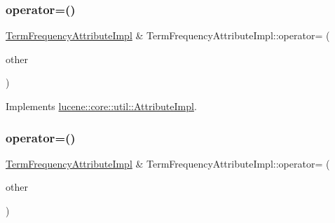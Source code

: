 \subsubsection{\texorpdfstring{operator=()}{operator=()}\hspace{0.1cm}{\footnotesize\ttfamily [1/2]}}
{\footnotesize\ttfamily \mbox{\hyperlink{classlucene_1_1core_1_1analysis_1_1tokenattributes_1_1TermFrequencyAttributeImpl}{Term\+Frequency\+Attribute\+Impl}} \& Term\+Frequency\+Attribute\+Impl\+::operator= (\begin{DoxyParamCaption}\item[{\mbox{\hyperlink{ZlibCrc32_8h_a2c212835823e3c54a8ab6d95c652660e}{const}} \mbox{\hyperlink{classlucene_1_1core_1_1util_1_1AttributeImpl}{lucene\+::core\+::util\+::\+Attribute\+Impl}} \&}]{other }\end{DoxyParamCaption})\hspace{0.3cm}{\ttfamily [virtual]}}



Implements \mbox{\hyperlink{classlucene_1_1core_1_1util_1_1AttributeImpl_ab032e399d03ce2f58c76881cf2b92325}{lucene\+::core\+::util\+::\+Attribute\+Impl}}.

\mbox{\label{classlucene_1_1core_1_1analysis_1_1tokenattributes_1_1TermFrequencyAttributeImpl_afb31133bdba35cd3e19bbe1aefed9908}} 
\subsubsection{\texorpdfstring{operator=()}{operator=()}\hspace{0.1cm}{\footnotesize\ttfamily [2/2]}}
{\footnotesize\ttfamily \mbox{\hyperlink{classlucene_1_1core_1_1analysis_1_1tokenattributes_1_1TermFrequencyAttributeImpl}{Term\+Frequency\+Attribute\+Impl}} \& Term\+Frequency\+Attribute\+Impl\+::operator= (\begin{DoxyParamCaption}\item[{\mbox{\hyperlink{ZlibCrc32_8h_a2c212835823e3c54a8ab6d95c652660e}{const}} \mbox{\hyperlink{classlucene_1_1core_1_1analysis_1_1tokenattributes_1_1TermFrequencyAttributeImpl}{Term\+Frequency\+Attribute\+Impl}} \&}]{other }\end{DoxyParamCaption})}

